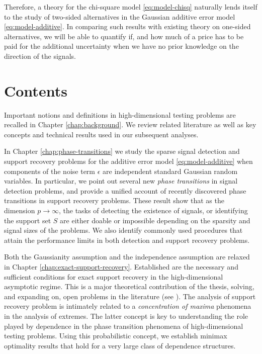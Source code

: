 Therefore, a theory for the chi-square model \eqref{eq:model-chisq} naturally lends itself to the study of two-sided alternatives in the Gaussian additive error model \eqref{eq:model-additive}.
In comparing such results with existing theory on one-sided alternatives, we will be able to quantify if, and how much of a price has to be paid for the additional uncertainty when we have no prior knowledge on the direction of the signals.


\section{Contents}

Important notions and definitions in high-dimensional testing problems are recalled in Chapter \ref{chap:background}. 
We review related literature as well as key concepts and technical results used in our subsequent analyses.

In Chapter \ref{chap:phase-transitions} we study the sparse signal detection and support recovery problems for the additive error model \eqref{eq:model-additive} when components of the noise term $\epsilon$ are independent standard Gaussian random variables.
In particular, we point out several new \emph{phase transitions} in signal detection problems, and provide a unified account of recently discovered phase transitions in support recovery problems.
These result show that as the dimension $p\to\infty$, the tasks of detecting the existence of signals, or identifying the support set $S$ are either doable or impossible depending on the sparsity and signal sizes of the problems.
We also identify commonly used procedures that attain the performance limits in both detection and support recovery problems.

Both the Gaussianity assumption and the independence assumption are relaxed in Chapter \ref{chap:exact-support-recovery}.
Established are the necessary and sufficient conditions for exact support recovery in the high-dimensional asymptotic regime.
This is a major theoretical contribution of the thesis, solving, and expanding on, open problems in the literature (see \cite{butucea2018variable, gao2018fundamental}).
The analysis of support recovery problem is intimately related to a \emph{concentration of maxima} phenomena in the analysis of extremes.
The latter concept is key to understanding the role played by dependence in the phase transition phenomena of high-dimensional testing problems.
Using this probabilistic concept, we establish minimax optimality results that hold for a very large class of dependence structures.

